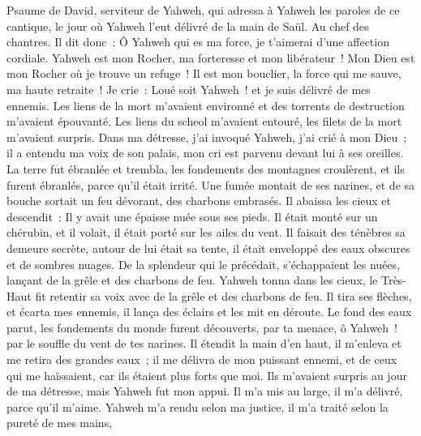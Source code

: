 \begin{multicols}{2}
\VerseOne{}Psaume de David, serviteur de Yahweh, qui adressa à Yahweh les paroles de ce cantique, le jour où Yahweh l'eut délivré de la main de Saül. Au chef des chantres.
Il dit donc~: Ô Yahweh qui es ma force, je t'aimerai d'une affection cordiale.
Yahweh est mon Rocher, ma forteresse et mon libérateur~! Mon Dieu est mon Rocher où je trouve un refuge~! Il est mon bouclier, la force qui me sauve, ma haute retraite~!
Je crie~: Loué soit Yahweh~! et je suis délivré de mes ennemis.
Les liens de la mort m'avaient environné et des torrents de destruction m'avaient épouvanté.
Les liens du scheol m'avaient entouré, les filets de la mort m'avaient surpris.
Dans ma détresse, j'ai invoqué Yahweh, j'ai crié à mon Dieu~; il a entendu ma voix de son palais, mon cri est parvenu devant lui à ses oreilles.
La terre fut ébranlée et trembla, les fondements des montagnes croulèrent, et ils furent ébranlés, parce qu'il était irrité.
Une fumée montait de ses narines, et de sa bouche sortait un feu dévorant, des charbons embrasés.
Il abaissa les cieux et descendit~: Il y avait une épaisse nuée sous ses pieds.
Il était monté sur un chérubin, et il volait, il était porté sur les ailes du vent.
Il faisait des ténèbres sa demeure secrète, autour de lui était sa tente, il était enveloppé des eaux obscures et de sombres nuages.
De la splendeur qui le précédait, s'échappaient les nuées, lançant de la grêle et des charbons de feu.
Yahweh tonna dans les cieux, le Très-Haut fit retentir sa voix avec de la grêle et des charbons de feu.
Il tira ses flèches, et écarta mes ennemis, il lança des éclairs et les mit en déroute.
Le fond des eaux parut, les fondements du monde furent découverts, par ta menace, ô Yahweh~! par le souffle du vent de tes narines.
Il étendit la main d'en haut, il m'enleva et me retira des grandes eaux~;
il me délivra de mon puissant ennemi, et de ceux qui me haïssaient, car ils étaient plus forts que moi.
Ils m'avaient surpris au jour de ma détresse, mais Yahweh fut mon appui.
Il m'a mis au large, il m'a délivré, parce qu'il m'aime.
Yahweh m'a rendu selon ma justice, il m'a traité selon la pureté de mes mains,

\end{multicols}
